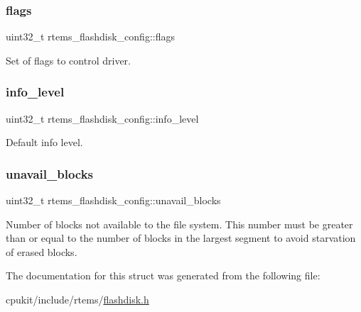 \subsubsection{\texorpdfstring{flags}{flags}}
{\footnotesize\ttfamily uint32\+\_\+t rtems\+\_\+flashdisk\+\_\+config\+::flags}

Set of flags to control driver. \mbox{\label{structrtems__flashdisk__config_a335a00f9e02f56e5c8f6ec07dcd2229b}} 
\subsubsection{\texorpdfstring{info\_level}{info\_level}}
{\footnotesize\ttfamily uint32\+\_\+t rtems\+\_\+flashdisk\+\_\+config\+::info\+\_\+level}

Default info level. \mbox{\label{structrtems__flashdisk__config_ad06eb8b2ba70e0207374aad689d55649}} 
\subsubsection{\texorpdfstring{unavail\_blocks}{unavail\_blocks}}
{\footnotesize\ttfamily uint32\+\_\+t rtems\+\_\+flashdisk\+\_\+config\+::unavail\+\_\+blocks}

Number of blocks not available to the file system. This number must be greater than or equal to the number of blocks in the largest segment to avoid starvation of erased blocks. 

The documentation for this struct was generated from the following file\+:\begin{DoxyCompactItemize}
\item 
cpukit/include/rtems/\mbox{\hyperlink{flashdisk_8h}{flashdisk.\+h}}\end{DoxyCompactItemize}
